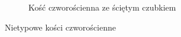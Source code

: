 \begin{figure}[h]
\begin{subfigure}{.45\textwidth}
        \caption{\label{fig:nietypowe_k4}Kość czworościenna ze ściętym czubkiem}
      \end{subfigure}%
    \caption{Nietypowe kości czworościenne}
    \label{fig:nietypowe_modern_k4}
\end{figure}